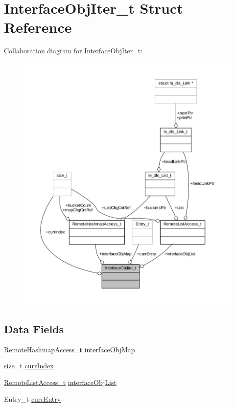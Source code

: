 \hypertarget{struct_interface_obj_iter__t}{}\section{Interface\+Obj\+Iter\+\_\+t Struct Reference}
\label{struct_interface_obj_iter__t}


Collaboration diagram for Interface\+Obj\+Iter\+\_\+t\+:
\nopagebreak
\begin{figure}[H]
\begin{center}
\leavevmode
\includegraphics[width=350pt]{struct_interface_obj_iter__t__coll__graph}
\end{center}
\end{figure}
\subsection*{Data Fields}
\begin{DoxyCompactItemize}
\item 
\hyperlink{struct_remote_hashmap_access__t}{Remote\+Hashmap\+Access\+\_\+t} \hyperlink{struct_interface_obj_iter__t_ae6d566bd8ff172e95994d2ff4ce70a19}{interface\+Obj\+Map}
\item 
size\+\_\+t \hyperlink{struct_interface_obj_iter__t_adf89558df500167be0f851904fc8af04}{curr\+Index}
\item 
\hyperlink{struct_remote_list_access__t}{Remote\+List\+Access\+\_\+t} \hyperlink{struct_interface_obj_iter__t_ad436cfde49c1ea9aebabab10608450e1}{interface\+Obj\+List}
\item 
Entry\+\_\+t \hyperlink{struct_interface_obj_iter__t_a087b2f81d8e0cb4ba7fd4d0735f44d5c}{curr\+Entry}
\end{DoxyCompactItemize}


